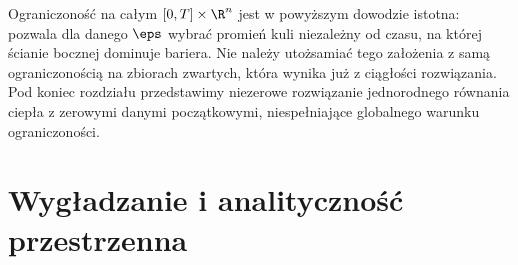 \begin{uwaga}
Ograniczoność na całym $[0,T]\times\R^n$ jest
w powyższym dowodzie istotna: pozwala dla danego
$\eps$ wybrać promień kuli niezależny od czasu,
na której ścianie bocznej dominuje bariera.
Nie należy utożsamiać tego założenia z samą
ograniczonością na zbiorach zwartych, która
wynika już z ciągłości rozwiązania.
Pod koniec rozdziału przedstawimy niezerowe
rozwiązanie jednorodnego równania ciepła z zerowymi
danymi początkowymi, niespełniające globalnego
warunku ograniczoności.
\end{uwaga}

\section{Wygładzanie i analityczność przestrzenna}
\label{sec:pde4-smoothing}

